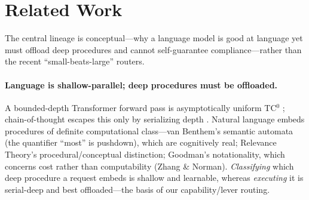 \section{Related Work}\label{sec:related}
The central lineage is conceptual---why a language model is good at language yet must offload deep procedures and cannot self-guarantee compliance---rather than the recent ``small-beats-large'' routers.

\paragraph{Language is shallow-parallel; deep procedures must be offloaded.} A bounded-depth Transformer forward pass is asymptotically uniform TC$^0$ \citep{ax2207_00729}; chain-of-thought escapes this only by serializing depth \citep{ax2305_15408,ax2402_12875}. Natural language embeds procedures of definite computational class---van Benthem's semantic automata (the quantifier ``most'' is pushdown), which are cognitively real; Relevance Theory's procedural/conceptual distinction; Goodman's notationality, which concerns cost rather than computability (Zhang \& Norman). \emph{Classifying} which deep procedure a request embeds is shallow and learnable, whereas \emph{executing} it is serial-deep and best offloaded---the basis of our capability/lever routing.

